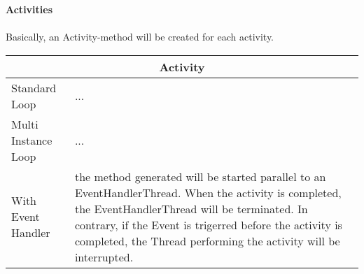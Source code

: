 \textbf{\large{Activities}}\\\\
Basically, an Activity-method will be created for each activity.  

\begin{table*}[h]
	\centering
		\begin{tabularx}{\linewidth}{|l|X|}\hline\hline
			\multicolumn{2}{|c|}{\textbf{Activity}} \\\hline\hline
			 Standard Loop & ... \\\hline
			 Multi Instance Loop & ... \\\hline
			 With Event Handler & the method generated will be started parallel to an EventHandlerThread. When the activity is completed, the EventHandlerThread will be terminated. In contrary, if the Event is trigerred before the activity is completed, the Thread performing the activity will be interrupted. \\\hline
		\end{tabularx}
\end{table*}\\\\